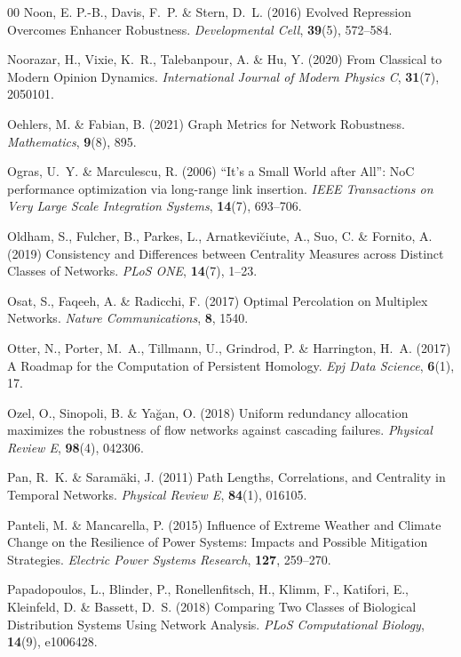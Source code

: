 \documentclass{comnet-mod}
\begin{document}
\begin{thebibliography}{00}
Noon, E. P.-B., Davis, F.~P. {\&} Stern, D.~L. (2016)  {Evolved Repression
  Overcomes Enhancer Robustness}. {\em {Developmental Cell}}, \textbf{39}(5),
  572--584.

Noorazar, H., Vixie, K.~R., Talebanpour, A. {\&} Hu, Y. (2020)  From Classical
  to Modern Opinion Dynamics. {\em International Journal of Modern Physics C},
  \textbf{31}(7), 2050101.

Oehlers, M. {\&} Fabian, B. (2021)  {Graph {{Metrics}} for {{Network
  Robustness}}}. {\em {Mathematics}}, \textbf{9}(8),
  895.

Ogras, U.~Y. {\&} Marculescu, R. (2006)  {``{{It}}'s a Small World after All'':
  {{ NoC performance optimization via long-range link insertion}}}. {\em {IEEE
  Transactions on Very Large Scale Integration Systems}}, \textbf{14}(7),
  693--706.

Oldham, S., Fulcher, B., Parkes, L., Arnatkevi{\u c}iute, A., Suo, C. {\&}
  Fornito, A. (2019)  {Consistency and Differences between Centrality Measures
  across Distinct Classes of Networks}. {\em {PLoS ONE}}, \textbf{14}(7),
  1--23.

Osat, S., Faqeeh, A. {\&} Radicchi, F. (2017)  {Optimal Percolation on
  Multiplex Networks}. {\em {Nature Communications}}, \textbf{8}, 1540.

Otter, N., Porter, M.~A., Tillmann, U., Grindrod, P. {\&} Harrington, H.~A.
  (2017)  {A Roadmap for the Computation of Persistent Homology}. {\em {Epj
  Data Science}}, \textbf{6}(1), 17.

Ozel, O., Sinopoli, B. {\&} Ya{\u{g}}an, O. (2018)  Uniform redundancy
  allocation maximizes the robustness of flow networks against cascading
  failures. {\em {Physical Review E}}, \textbf{98}(4), 042306.

Pan, R.~K. {\&} Saram{\"a}ki, J. (2011)  {Path Lengths, Correlations, and
  Centrality in Temporal Networks}. {\em {Physical Review E}}, \textbf{84}(1),
  016105.

Panteli, M. {\&} Mancarella, P. (2015)  {Influence of Extreme Weather and
  Climate Change on the Resilience of Power Systems: {{Impacts}} and Possible
  Mitigation Strategies}. {\em {Electric Power Systems Research}},
  \textbf{127}, 259--270.

Papadopoulos, L., Blinder, P., Ronellenfitsch, H., Klimm, F., Katifori, E.,
  Kleinfeld, D. {\&} Bassett, D.~S. (2018)  {Comparing Two Classes of
  Biological Distribution Systems Using Network Analysis}. {\em {PLoS
  Computational Biology}}, \textbf{14}(9), e1006428.


\end{thebibliography}
\end{document}
